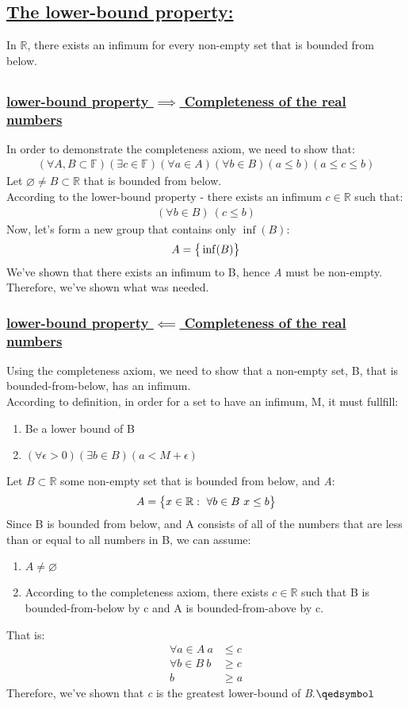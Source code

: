 \documentclass[a4paper, 12pt]{article}
\newcommand{\sub}[1]{\subsection{\underline{#1}}}
\newcommand{\subsub}[1]{\subsubsection{\underline{#1}}}
\newcommand{\R}{\ensuremath{\mathbb{R}}}
\newcommand{\F}{\ensuremath{\mathbb{F}}}
\newcommand{\eq}[1]{\begin{align*}#1\end{align*}}
\renewcommand{\qed}{\hfill\(\qedsymbol\)}
\begin{document}
\section{}
\sub{The lower-bound property:}
{\Large{In \R, there exists an infimum for every non-empty set that is bounded from below.}}
\sub{}
\subsub{lower-bound property $\implies$ Completeness of the real numbers}
In order to demonstrate the completeness axiom, we need to show that:
\eq{(\forall{A,B}\subset\F)(\exists{c}\in\F)(\forall{a}\in{A})(\forall{b}\in{B})(a\leq{b})(a\leq{c}\leq{b})}
Let $\varnothing\neq{B}\subset\R$ that is bounded from below.\\
According to the lower-bound property - there exists an infimum $c\in\R$ such that:
\eq{(\forall{b}\in{B})~(c\leq{b})}
Now, let's form a new group that contains only $\inf(B)$: \eq{A=\big\{\inf(B)\big{\}}}
We've shown that there exists an infimum to B, hence \textit{A} must be non-empty.\\
Therefore, we've shown what was needed.
\subsub{lower-bound property $\impliedby$ Completeness of the real numbers}
Using the completeness axiom, we need to show that a non-empty set, B, that is bounded-from-below, has an infimum.\\
According to definition, in order for a set to have an infimum, M, it must fullfill:
\begin{enumerate}
    \item Be a lower bound of B
    \item $(\forall\epsilon>0)(\exists{b}\in{B})(a<M+\epsilon)$
\end{enumerate}
Let $B\subset\R$ some non-empty set that is bounded from below, and \textit{A}: \eq{A=\big\{x\in\R:~\forall{b}\in{B}~x\leq{b}\big{\}}}
Since B is bounded from below, and A consists of all of the numbers that are less than or equal to all numbers in B, we can assume:
\begin{enumerate}
    \item $A\neq{\varnothing}$
    \item According to the completeness axiom, there exists $c\in\R$ such that B is bounded-from-below by c and A is bounded-from-above by c.
\end{enumerate}
That is: \eq{\forall{a}\in{A}~a&\leq{c}\\\forall{b}\in{B}~b&\geq{c}\\b&\geq{a}}
Therefore, we've shown that \textit{c} is the greatest lower-bound of \textit{B}.\qed

\section{}


\end{document}
